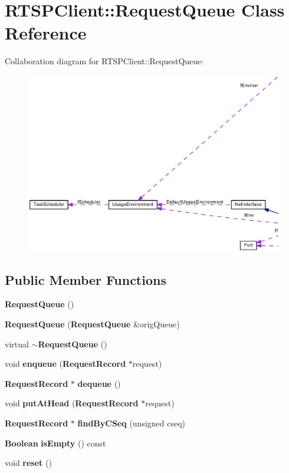\section{R\+T\+S\+P\+Client\+:\+:Request\+Queue Class Reference}
\label{classRTSPClient_1_1RequestQueue}


Collaboration diagram for R\+T\+S\+P\+Client\+:\+:Request\+Queue\+:
\nopagebreak
\begin{figure}[H]
\begin{center}
\leavevmode
\includegraphics[width=350pt]{classRTSPClient_1_1RequestQueue__coll__graph}
\end{center}
\end{figure}
\subsection*{Public Member Functions}
\begin{DoxyCompactItemize}
\item 
{\bf Request\+Queue} ()
\item 
{\bf Request\+Queue} ({\bf Request\+Queue} \&orig\+Queue)
\item 
virtual {\bf $\sim$\+Request\+Queue} ()
\item 
void {\bf enqueue} ({\bf Request\+Record} $\ast$request)
\item 
{\bf Request\+Record} $\ast$ {\bf dequeue} ()
\item 
void {\bf put\+At\+Head} ({\bf Request\+Record} $\ast$request)
\item 
{\bf Request\+Record} $\ast$ {\bf find\+By\+C\+Seq} (unsigned cseq)
\item 
{\bf Boolean} {\bf is\+Empty} () const 
\item 
void {\bf reset} ()
\end{DoxyCompactItemize}
